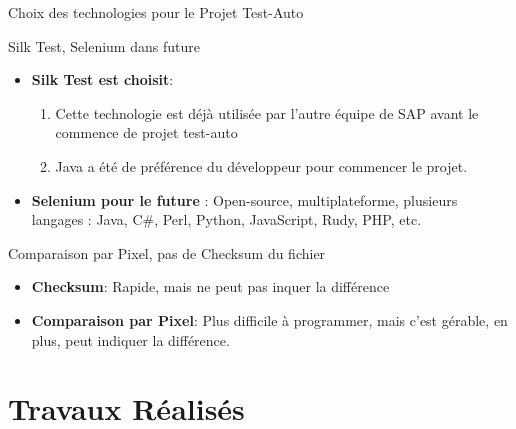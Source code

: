 \documentclass{beamer}
\begin{document}
        \begin{frame}{Choix des technologies pour le Projet Test-Auto}
            \begin{block}{Silk Test, Selenium dans future}
                \begin{itemize}
                    \item \textbf{Silk Test est choisit}:
                        \begin{enumerate}
                            \item Cette technologie est déjà utilisée par l'autre équipe de SAP avant le commence de projet test-auto
                            \item Java a été de préférence du développeur pour commencer le projet.
                        \end{enumerate}
                    \item \textbf{Selenium pour le future} : Open-source, multiplateforme, plusieurs langages : Java, C\#, Perl, Python, JavaScript, Rudy, PHP, etc.
                \end{itemize}
            \end{block}
            
            \begin{block}{Comparaison par Pixel, pas de Checksum du fichier}
                \begin{itemize}
                    \item \textbf{Checksum}: Rapide, mais ne peut pas inquer la différence
                    \item \textbf{Comparaison par Pixel}: Plus difficile à programmer, mais c'est gérable, en plus, peut indiquer la différence.
                \end{itemize}
            \end{block}
            
        \end{frame}
    \section{Travaux Réalisés}
\end{document}
